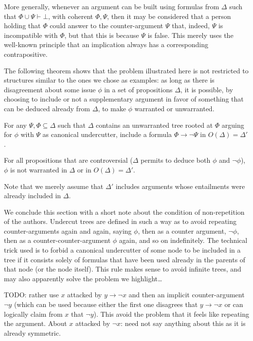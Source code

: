 \documentclass[version=3.21, pagesize, twoside=off, bibliography=totoc, DIV=calc, fontsize=12pt, a4paper, french, english]{scrartcl}
\begin{document}
More generally, whenever an argument can be built using formulas from $\Delta$ such that $\Phi \cup \Psi ⊢ ⊥$, with coherent $\Phi, \Psi$, then it may be considered that a person holding that $\Phi$ could answer to the counter-argument $\Psi$ that, indeed, $\Psi$ is incompatible with $\Phi$, but that this is because $\Psi$ is false. This merely uses the well-known principle that an implication always has a corresponding contrapositive.

The following theorem shows that the problem illustrated here is not restricted to structures similar to the ones we chose as examples: as long as there is disagreement about some issue $\phi$ in a set of propositions $\Delta$, it is possible, by choosing to include or not a supplementary argument in favor of something that can be deduced already from $\Delta$, to make $\phi$ warranted or unwarranted.

\begin{definition}
	For any $ \Psi, \Phi \subseteq \Delta$ such that $\Delta$ contains an unwarranted tree rooted at $\Phi$ arguing for $\phi$ with $\Psi$ as canonical undercutter, include a formula $\Phi → ¬\Psi$ in $O(\Delta) = \Delta'$. 
\end{definition}

\begin{theorem}
	For all propositions that are controversial ($\Delta$ permits to deduce both $\phi$ and $¬\phi$), $\phi$ is not warranted in $\Delta$ or in $O(\Delta) = \Delta'$.
\end{theorem}
Note that we merely assume that $\Delta'$ includes arguments whose entailments were already included in $\Delta$.

We conclude this section with a short note about the condition of non-repetition of the authors. Undercut trees are defined in such a way as to avoid repeating counter-arguments again and again, saying $\phi$, then as a counter argument, $¬\phi$, then as a counter-counter-argument $\phi$ again, and so on indefinitely. The technical trick used is to forbid a canonical undercutter of some node to be included in a tree if it consists solely of formulas that have been used already in the parents of that node (or the node itself). This rule makes sense to avoid infinite trees, and may also apparently solve the problem we highlight…

TODO: rather use $x$ attacked by $y → ¬x$ and then an implicit counter-argument $¬y$ (which can be used because either the first one disagrees that $y → ¬x$ or can logically claim from $x$ that $¬y$). This avoid the problem that it feels like repeating the argument. About $x$ attacked by $¬x$: need not say anything about this as it is already symmetric.
\end{document}
